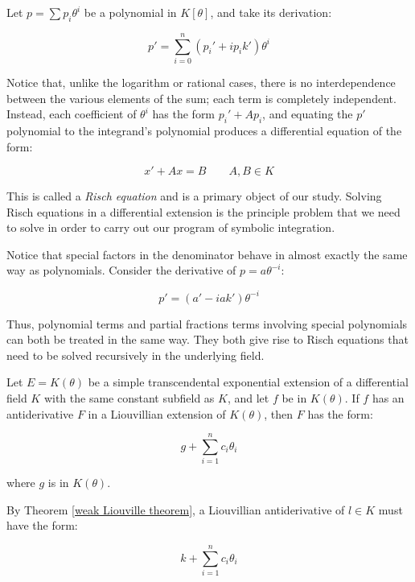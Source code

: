 \begin{comment}

t=tan x
t^2+1 = tan^2 x + 1 = sec^2 x
d(t^2+1) = 2tdt = 2 tan x sec^2 x

dt/dx = sec^2 x = (1 + tan^2 x)
Dt = t^2 + 1
D(t^2+1) = 2t(t^2+1)

\end{comment}

Let $p=\sum p_i \theta^i$ be a polynomial in $K[\theta]$,
and take its derivation:

$$p' = \sum_{i=0}^n (p_i' + i p_i k') \theta^i$$

Notice that, unlike the logarithm or rational cases, there is no
interdependence between the various elements of the sum; each term is
completely independent.  Instead, each coefficient of $\theta^i$ has
the form $p_i' + A p_i$, and equating the $p'$ polynomial to the
integrand's polynomial produces a differential equation of the form:

$$x' + A x = B \qquad A,B \in K$$

This is called a {\it Risch equation} and is a primary object of our
study.  Solving Risch equations in a differential extension is the
principle problem that we need to solve in order to carry out our
program of symbolic integration.

Notice that special factors in the denominator behave in almost
exactly the same way as polynomials.  Consider the derivative of
$p=a \theta^{-i}$:

$$p' = (a' - i a k') \theta^{-i}$$

Thus, polynomial terms and partial fractions terms involving special
polynomials can both be treated in the same way.  They both give rise
to Risch equations that need to be solved recursively in the underlying
field.

\theorem

Let $E=K(\theta)$ be a simple transcendental exponential extension of
a differential field $K$ with the same constant subfield as $K$, and
let $f$ be in $K(\theta)$.  If $f$ has an antiderivative $F$ in
a Liouvillian extension of $K(\theta)$, then $F$ has the form:

$$g + \sum_{i=1}^n c_i \theta_i$$

where $g$ is in $K(\theta)$.

\proof

By Theorem \ref{weak Liouville theorem}, a Liouvillian antiderivative
of $l \in K$ must have the form:

$$k + \sum_{i=1}^n c_i \theta_i$$

